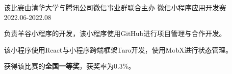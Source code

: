 
\begin{cventries}

\cventry
    {该比赛由清华大学与腾讯公司微信事业群联合主办} %
    {微信小程序应用开发赛} %
    {} %
    {2022.06-2022.08} %
    {
    \begin{cvitems} %
        \item {负责羊谷小程序的开发，该小程序使用GitHub进行项目管理与合作开发。}
        \item {该小程序使用React与小程序跨端框架Taro开发，使用MobX进行状态管理。}
        \item {获得该比赛的\textbf{全国一等奖}，获奖率为0.3\%。}
    \end{cvitems}
    }

\end{cventries}
